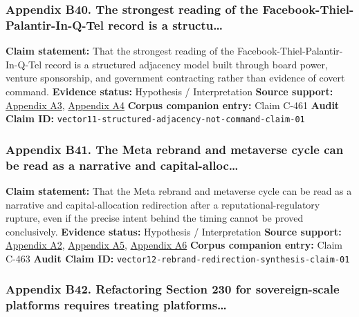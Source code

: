 \documentclass[
  american,
  11pt,
  letterpaper,
]{article}
\begin{document}
\subsubsection{Appendix B40. The strongest reading of the
Facebook-Thiel-Palantir-In-Q-Tel record is a
structu\ldots{}}\label{ch-01-appendix-b40-the-strongest-reading-of-the-facebook-thiel-palantir-in-q-tel-record-is-a-structu}

\textbf{Claim statement:} That the strongest reading of the
Facebook-Thiel-Palantir-In-Q-Tel record is a structured adjacency model
built through board power, venture sponsorship, and government
contracting rather than evidence of covert command. \textbf{Evidence
status:} Hypothesis / Interpretation \textbf{Source support:}
\hyperref[ch-01-appendix-a3-facebook-inc-registration-statement-on-form-s-1]{Appendix
A3},
\hyperref[ch-01-appendix-a4-meta-platforms-inc-2022-definitive-proxy-statement]{Appendix
A4} \textbf{Corpus companion entry:} Claim C-461 \textbf{Audit Claim
ID:} \texttt{vector11-structured-adjacency-not-command-claim-01}

\subsubsection{Appendix B41. The Meta rebrand and metaverse cycle can be
read as a narrative and
capital-alloc\ldots{}}\label{ch-01-appendix-b41-the-meta-rebrand-and-metaverse-cycle-can-be-read-as-a-narrative-and-capital-alloc}

\textbf{Claim statement:} That the Meta rebrand and metaverse cycle can
be read as a narrative and capital-allocation redirection after a
reputational-regulatory rupture, even if the precise intent behind the
timing cannot be proved conclusively. \textbf{Evidence status:}
Hypothesis / Interpretation \textbf{Source support:}
\hyperref[ch-01-appendix-a2-ftc-imposes-5-billion-penalty-and-sweeping-new-privacy-restrictions-on-facebook]{Appendix
A2},
\hyperref[ch-01-appendix-a5-the-facebook-company-is-now-meta]{Appendix
A5},
\hyperref[ch-01-appendix-a6-meta-platforms-inc-2023-annual-report-form-10-k]{Appendix
A6} \textbf{Corpus companion entry:} Claim C-463 \textbf{Audit Claim
ID:} \texttt{vector12-rebrand-redirection-synthesis-claim-01}

\subsubsection{Appendix B42. Refactoring Section 230 for sovereign-scale
platforms requires treating
platforms\ldots{}}\label{ch-01-appendix-b42-refactoring-section-230-for-sovereign-scale-platforms-requires-treating-platforms}
\end{document}
